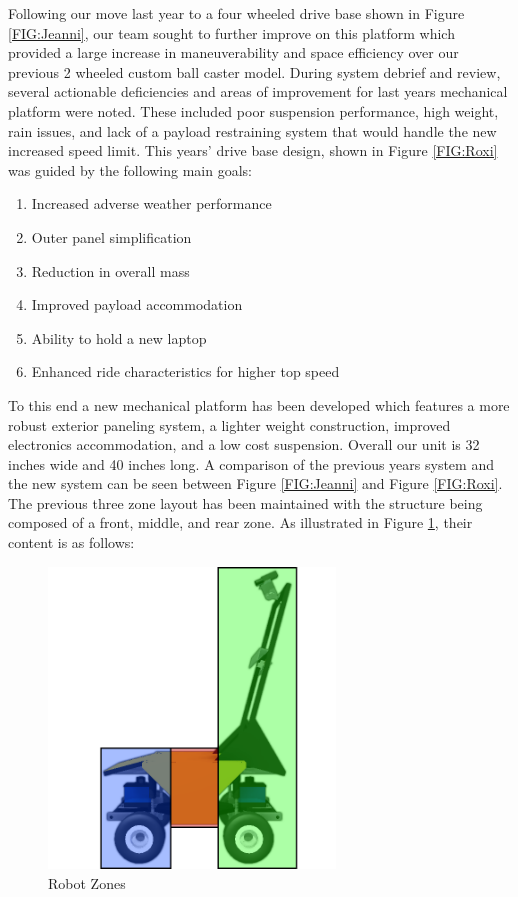 Following our move last year to a four wheeled drive base shown in Figure \ref{FIG:Jeanni}, our team sought to further improve on this platform which provided a large increase in maneuverability and space efficiency over our previous 2 wheeled custom ball caster model. During system debrief and review, several actionable deficiencies and areas of improvement for last years mechanical platform were noted. These included poor suspension performance, high weight, rain issues, and lack of a payload restraining system that would handle the new increased speed limit. This years' drive base design, shown in Figure \ref{FIG:Roxi} was guided by the following main goals:

\begin{enumerate}
\item Increased adverse weather performance
\item Outer panel simplification
\item Reduction in overall mass
\item Improved payload accommodation
\item Ability to hold a new laptop
\item Enhanced ride characteristics for higher top speed
\end{enumerate}

To this end a new mechanical platform has been developed which features a more robust exterior paneling system, a lighter weight construction, improved electronics accommodation, and a low cost suspension. Overall our unit is 32 inches wide and 40 inches long. A comparison of the previous years system and the new system can be seen between Figure \ref{FIG:Jeanni} and Figure \ref{FIG:Roxi}. The previous three zone layout has been maintained with the structure being composed of a front, middle, and rear zone. As illustrated in Figure \ref{FIG:Zones}, their content is as follows:

\begin{figure}[H]
\begin{center}
\includegraphics[width=3in]{./pics/RobotZones.png}
\caption{Robot Zones}
\label{FIG:Zones}
\end{center}
\end{figure}

